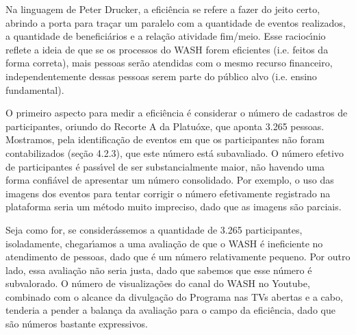 \documentclass[
12pt,		%
openright,	%
twoside,  %
a4paper,			%
chapter=TITLE,		%
english,			%
french,				%
spanish,			%
brazil				%
]{USPSC-classe/USPSC}
\begin{document}
Na linguagem de Peter Drucker, a efici\^encia se refere a \textquotedbl fazer do jeito certo\textquotedbl , abrindo a porta para tra\c{c}ar um paralelo com a quantidade de eventos realizados, a quantidade de benefici\'arios e a rela\c{c}\~ao atividade fim/meio. Esse racioc\'{\i}nio reflete a ideia de que se os processos do WASH forem eficientes (i.e. \textquotedbl feitos da forma correta\textquotedbl ), mais pessoas ser\~ao atendidas com o mesmo recurso financeiro, independentemente dessas pessoas serem parte do p\'ublico alvo (i.e. ensino fundamental).

















O primeiro aspecto para medir a efici\^encia \'e considerar o n\'umero de cadastros de participantes, oriundo do Recorte A da Platu\'oxe, que aponta 3.265 pessoas. Mostramos, pela identifica\c{c}\~ao de eventos em que os participantes n\~ao foram contabilizados (se\c{c}\~ao 4.2.3), que este n\'umero est\'a subavaliado. O n\'umero efetivo de participantes \'e pass\'{\i}vel de ser substancialmente maior, n\~ao havendo uma forma confi\'avel de apresentar um n\'umero consolidado. Por exemplo, o uso das imagens dos eventos para tentar corrigir o n\'umero efetivamente registrado na plataforma seria um m\'etodo muito impreciso, dado que as imagens s\~ao parciais.

















Seja como for, se consider\'assemos a quantidade de 3.265 participantes, isoladamente, chegar\'{\i}amos a uma avalia\c{c}\~ao de que o WASH \'e ineficiente no atendimento de pessoas, dado que \'e um n\'umero relativamente pequeno. Por outro lado, essa avalia\c{c}\~ao n\~ao seria justa, dado que sabemos que esse n\'umero \'e subvalorado. O n\'umero de visualiza\c{c}\~oes do canal do WASH no Youtube, combinado com o alcance da divulga\c{c}\~ao do Programa nas TVs abertas e a cabo, tenderia a pender a balan\c{c}a da avalia\c{c}\~ao para o campo da efici\^encia, dado que s\~ao n\'umeros bastante expressivos.
\end{document}
